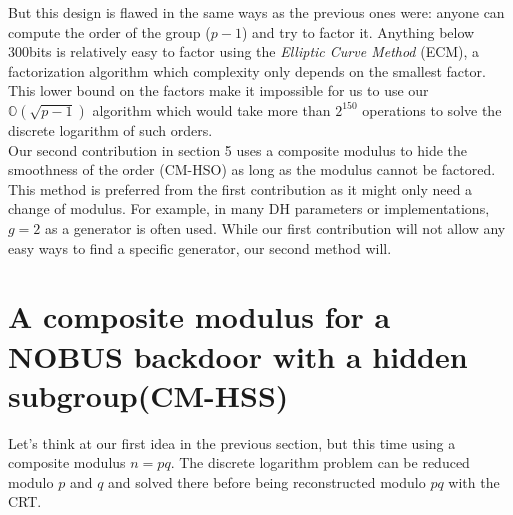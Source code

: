 \documentclass[a4paper,11pt,twocolumn]{article}
\begin{document}
But this design is flawed in the same ways as the previous ones were: anyone can compute the order of the group ($p - 1$) and try to factor it. Anything below 300bits is relatively easy to factor using the \emph{Elliptic Curve Method} (ECM), a factorization algorithm which complexity only depends on the smallest factor. This lower bound on the factors make it impossible for us to use our $\mathbb{O}(\sqrt{p-1})$ algorithm which would take more than $2^{150}$ operations to solve the discrete logarithm of such orders. \\

Our second contribution in section 5 uses a composite modulus to hide the smoothness of the order (CM-HSO) as long as the modulus cannot be factored. This method is preferred from the first contribution as it might only need a change of modulus. For example, in many DH parameters or implementations, $g=2$ as a generator is often used. While our first contribution will not allow any easy ways to find a specific generator, our second method will.

\section{A composite modulus for a NOBUS backdoor with a hidden subgroup(CM-HSS)}

Let's think at our first idea in the previous section, but this time using a composite modulus $n=pq$. The discrete logarithm problem can be reduced modulo $p$ and $q$ and solved there before being reconstructed modulo $pq$ with the CRT.

\begin{center}
\end{center}
\end{document}
